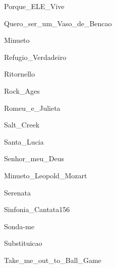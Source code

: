 \documentclass{scrartcl}
\begin{document}

{Porque_ELE_Vive}


{Quero_ser_um_Vaso_de_Bencao}


{Minueto}


{Refugio_Verdadeiro}


{Ritornello}


{Rock_Ages}


{Romeu_e_Julieta}


{Salt_Creek}


{Santa_Lucia}


{Senhor_meu_Deus}


{Minueto_Leopold_Mozart}


{Serenata}


{Sinfonia_Cantata156}


{Sonda-me}


{Substituicao}


{Take_me_out_to_Ball_Game}
\end{document}

